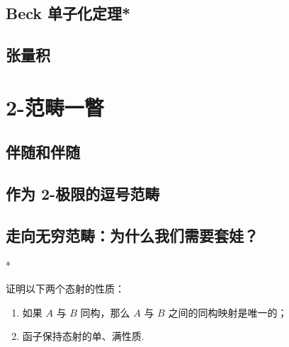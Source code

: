 \subsection{Beck 单子化定理*}

\subsection{张量积}

\section{2-范畴一瞥}

\subsection{伴随和伴随}

\subsection{作为 2-极限的逗号范畴}

\subsection{走向无穷范畴：为什么我们需要套娃？}

\begin{exercise}

    \begin{exgroup}* %
        \item 证明以下两个态射的性质：
        \begin{enumerate}
            \item 如果 $A$ 与 $B$ 同构，那么 $A$ 与 $B$ 之间的同构映射是唯一的；
            \item 函子保持态射的单、满性质.
        \end{enumerate}
    \end{exgroup}
\end{exercise}
